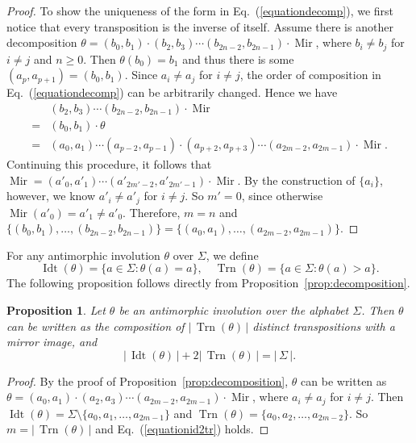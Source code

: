 \documentclass[12pt]{article}
\def\abs#1{{|\,#1\,|}}
\def\mirror{{\operatorname{Mir}}}
\def\id{{\operatorname{Idt}}}
\def\tr{{\operatorname{Trn}}}
\newtheorem{proposition}[theorem]{Proposition}
\begin{document}
\begin{proof}
To show the uniqueness of the form in Eq.~(\ref{equationdecomp}), we
first notice that every transposition is the inverse of itself.
Assume there is another decomposition
$\theta=(b_0,b_1)\cdot(b_2,b_3)\cdots(b_{2n-2},b_{2n-1})\cdot\mirror$,
where $b_i\neq b_j$ for $i\neq j$ and $n\geq 0$. Then
$\theta(b_0)=b_1$ and thus there is some $(a_p,a_{p+1})=(b_0,b_1)$.
Since $a_i\neq a_j$ for $i\neq j$, the order of composition in
Eq.~(\ref{equationdecomp}) can be arbitrarily changed. Hence we have
\begin{align*}
  & (b_2,b_3)\cdots(b_{2n-2},b_{2n-1})\cdot\mirror \\
  =&(b_0,b_1)\cdot\theta \\
  =&(a_0,a_1)\cdots(a_{p-2},a_{p-1})\cdot(a_{p+2},a_{p+3})\cdots(a_{2m-2},a_{2m-1})\cdot\mirror.
\end{align*}
Continuing this procedure, it follows that
$\mirror=(a'_0,a'_1)\cdots(a'_{2m'-2},a'_{2m'-1})\cdot\mirror$. By
the construction of $\{a_i\}$, however, we know $a'_i\neq a'_j$ for
$i\neq j$. So $m'=0$, since otherwise $\mirror(a'_0)=a'_1\neq a'_0$.
Therefore, $m=n$ and
$\{(b_0,b_1),\ldots,(b_{2n-2},b_{2n-1})\}=\{(a_0,a_1),\ldots,(a_{2m-2},a_{2m-1})\}$.
\end{proof}


For any antimorphic involution $\theta$ over $\Sigma$, we define
  $$\id(\theta)={\{a\in\Sigma: \theta(a)=a\}},
  \quad\tr(\theta)={\{a\in\Sigma: \theta(a)>a\}}.$$
The following proposition follows directly from
Proposition~\ref{prop:decomposition}.


\begin{proposition}\label{prop:id+2tr=absigma}
Let $\theta$ be an antimorphic involution over the alphabet
$\Sigma$. Then $\theta$ can be written as the composition of
$\abs{\tr(\theta)}$ distinct transpositions with a mirror image, and
\begin{equation}\label{equationid2tr}
  \abs{\id(\theta)}+2\abs{\tr(\theta)}=\abs{\Sigma}.
\end{equation}
\end{proposition}
\begin{proof}
By the proof of Proposition~\ref{prop:decomposition}, $\theta$ can
be written as
$\theta=(a_0,a_1)\cdot(a_2,a_3)\cdots(a_{2m-2},a_{2m-1})\cdot\mirror$,
where $a_i\neq a_j$ for $i\neq j$. Then
$\id(\theta)=\Sigma\setminus\{a_0,a_1,\ldots,a_{2m-1}\}$ and
$\tr(\theta)=\{a_0,a_2,\ldots,a_{2m-2}\}$. So $m=\abs{\tr(\theta)}$
and Eq.~(\ref{equationid2tr}) holds.
\end{proof}
\end{document}
